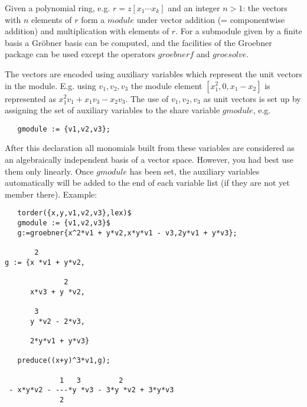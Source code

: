 Given a polynomial ring, e.g. $r=z[x_1 \cdots x_k]$ and
an integer $n>1$: the vectors with $n$ elements of $r$
form a $module$ under vector addition (= componentwise addition)
and multiplication with elements of $r$. For a submodule
given by a finite basis a Gr\"obner basis
can be computed, and the facilities of the Groebner package
can be used except the operators $groebnerf$ and $groesolve$.

The vectors are encoded using auxiliary variables which represent
the unit vectors in the module. E.g. using ${v_1,v_2,v_3}$ the
module element $[x_1^2,0,x_1-x_2]$ is represented as
$x_1^2 v_1 + x_1 v_3 - x_2 v_3$. The use of ${v_1,v_2,v_3}$
as unit vectors is set up by assigning the set of auxiliary variables
to the share variable $gmodule$, e.g.
\begin{verbatim}
   gmodule := {v1,v2,v3};
\end{verbatim}
After this declaration all monomials built from these variables
are considered as an algebraically independent basis of a vector
space. However, you had best use them only linearly. Once $gmodule$
has been set, the auxiliary variables automatically will be
added to the end of each variable list (if they are not yet
member there).
Example:
\begin{verbatim}
   torder({x,y,v1,v2,v3},lex)$
   gmodule := {v1,v2,v3}$
   g:=groebner{x^2*v1 + y*v2,x*y*v1 - v3,2y*v1 + y*v3};

       2
g := {x *v1 + y*v2,

              2
      x*v3 + y *v2,

       3
      y *v2 - 2*v3,

      2*y*v1 + y*v3}

   preduce((x+y)^3*v1,g);

             1   3         2
 - x*y*v2 - ---*y *v3 - 3*y *v2 + 3*y*v3
             2

\end{verbatim}


